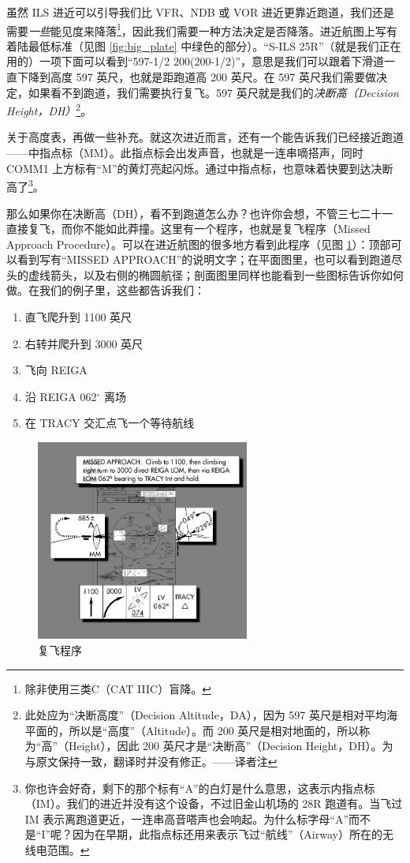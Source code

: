虽然 ILS 进近可以引导我们比 VFR、NDB 或 VOR 进近更靠近跑道，我们还是需要\emph{一些}能见度来降落\footnote{除非使用三类C（CAT IIIC）盲降。}，因此我们需要一种方法决定是否降落。进近航图上写有着陆最低标准（见图 \ref{fig:big_plate} 中绿色的部分）。“S-ILS 25R”（就是我们正在用的）一项下面可以看到“597-1/2 200(200-1/2)”，意思是我们可以跟着下滑道一直下降到高度 597 英尺，也就是距跑道高 200 英尺。在 597 英尺我们需要做决定，如果看不到跑道，我们需要执行复飞。597 英尺就是我们的\emph{决断高（Decision Height，DH）}\footnote{此处应为“决断高度”（Decision Altitude，DA），因为 597 英尺是相对平均海平面的，所以是“高度”（Altitude）。而 200 英尺是相对地面的，所以称为“高”（Height），因此 200 英尺才是“决断高”（Decision Height，DH）。为与原文保持一致，翻译时并没有修正。——译者注}。

关于高度表，再做一些补充。就这次进近而言，还有一个能告诉我们已经接近跑道——中指点标（MM）。此指点标会出发声音，也就是一连串嘀搭声，同时 COMM1 上方标有“M”的黄灯亮起闪烁。通过中指点标，也意味着快要到达决断高了\footnote{你也许会好奇，剩下的那个标有“A”的白灯是什么意思，这表示内指点标（IM）。我们的进近并没有这个设备，不过旧金山机场的 28R 跑道有。当飞过 IM 表示离跑道更近，一连串高音嗒声也会响起。为什么标字母“A”而不是“I”呢？因为在早期，此指点标还用来表示飞过“航线”（Airway）所在的无线电范围。}。

那么如果你在决断高（DH），看不到跑道怎么办？也许你会想，不管三七二十一直接复飞，而你不能如此莽撞。这里有一个程序，也就是复飞程序（Missed Approach Procedure）。可以在进近航图的很多地方看到此程序（见图 \ref{fig:MAP}）：顶部可以看到写有“MISSED APPROACH”的说明文字；在平面图里，也可以看到跑道尽头的虚线箭头，以及右侧的椭圆航径；剖面图里同样也能看到一些图标告诉你如何做。在我们的例子里，这些都告诉我们：

\begin{enumerate}
\item 直飞爬升到 1100 英尺
\item 右转并爬升到 3000 英尺
\item 飞向 REIGA
\item 沿 REIGA 062$^\circ$ 离场
\item 在 TRACY 交汇点飞一个等待航线
\end{enumerate}

\begin{figure}
  \begin{center}
    \includegraphics[width=7cm]{img/MAP}
    \caption{复飞程序}
    \label{fig:MAP}
  \end{center}
\end{figure}

